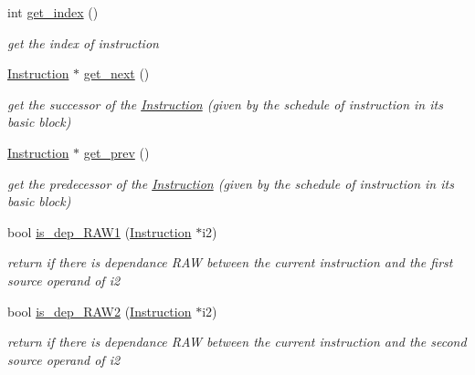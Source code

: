 \begin{DoxyCompactItemize}
\mbox{\label{class_instruction_a14c5f91c242a5b58eda9f123ad331cbe}} 
int \mbox{\hyperlink{class_instruction_a14c5f91c242a5b58eda9f123ad331cbe}{get\+\_\+index}} ()
\begin{DoxyCompactList}\small\item\em get the index of instruction \end{DoxyCompactList}\item 
\mbox{\label{class_instruction_a93d5d6186afcf358c5a21f4c57a0d72e}} 
\mbox{\hyperlink{class_instruction}{Instruction}} $\ast$ \mbox{\hyperlink{class_instruction_a93d5d6186afcf358c5a21f4c57a0d72e}{get\+\_\+next}} ()
\begin{DoxyCompactList}\small\item\em get the successor of the \mbox{\hyperlink{class_instruction}{Instruction}} (given by the schedule of instruction in its basic block) \end{DoxyCompactList}\item 
\mbox{\label{class_instruction_afd6f27235469926b1e7979220495a6f0}} 
\mbox{\hyperlink{class_instruction}{Instruction}} $\ast$ \mbox{\hyperlink{class_instruction_afd6f27235469926b1e7979220495a6f0}{get\+\_\+prev}} ()
\begin{DoxyCompactList}\small\item\em get the predecessor of the \mbox{\hyperlink{class_instruction}{Instruction}} (given by the schedule of instruction in its basic block) \end{DoxyCompactList}\item 
bool \mbox{\hyperlink{class_instruction_ae5d54f535adab416c53eb0ff6a438804}{is\+\_\+dep\+\_\+\+R\+A\+W1}} (\mbox{\hyperlink{class_instruction}{Instruction}} $\ast$i2)
\begin{DoxyCompactList}\small\item\em return if there is dependance R\+AW between the current instruction and the first source operand of i2 ~\newline
 \end{DoxyCompactList}\item 
bool \mbox{\hyperlink{class_instruction_aa28ae5f427ee02c96466f1ac68060f87}{is\+\_\+dep\+\_\+\+R\+A\+W2}} (\mbox{\hyperlink{class_instruction}{Instruction}} $\ast$i2)
\begin{DoxyCompactList}\small\item\em return if there is dependance R\+AW between the current instruction and the second source operand of i2 ~\newline

\end{DoxyCompactList}
\end{DoxyCompactItemize}
